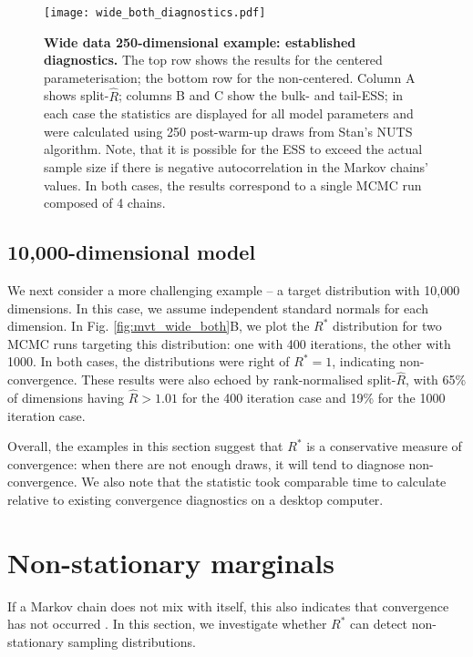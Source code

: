 \documentclass{article}
\begin{document}
\begin{figure}[!htb]
	\centerline{\texttt{[image: wide\_both\_diagnostics.pdf]}}
	\caption{\textbf{Wide data 250-dimensional example: established diagnostics.} The top row shows the results for the centered parameterisation; the bottom row for the non-centered. Column A shows split-$\widehat{R}$; columns B and C show the bulk- and tail-ESS; in each case the statistics are displayed for all model parameters and were calculated using 250 post-warm-up draws from Stan's NUTS algorithm. Note, that it is possible for the ESS to exceed the actual sample size if there is negative autocorrelation in the Markov chains' values. In both cases, the results correspond to a single MCMC run composed of 4 chains.}
	\label{fig:wide_both_diagnostics}
\end{figure}

\subsection{10,000-dimensional model}
We next consider a more challenging example -- a target distribution with 10,000 dimensions. In this case, we assume independent standard normals for each dimension. In Fig. \ref{fig:mvt_wide_both}B, we plot the $R^*$ distribution for two MCMC runs targeting this distribution: one with 400 iterations, the other with 1000. In both cases, the distributions were right of $R^*=1$, indicating non-convergence. These results were also echoed by rank-normalised split-$\widehat{R}$, with 65\% of dimensions having $\widehat{R}>1.01$ for the 400 iteration case and 19\% for the 1000 iteration case.

Overall, the examples in this section suggest that $R^*$ is a conservative measure of convergence: when there are not enough draws, it will tend to diagnose non-convergence. We also note that the statistic took comparable time to calculate relative to existing convergence diagnostics on a desktop computer.

\section{Non-stationary marginals}\label{sec:non-stationary}
If a Markov chain does not mix with itself, this also indicates that convergence has not occurred \citep{gelman2013bayesian}. In this section, we investigate whether $R^*$ can detect non-stationary sampling distributions.
\end{document}
